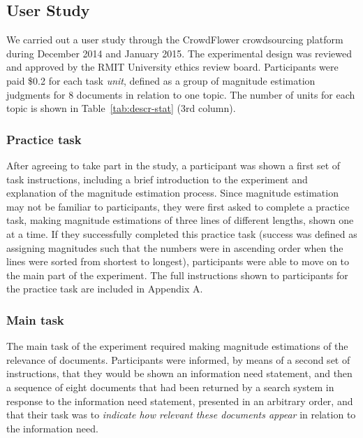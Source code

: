 \subsection{User Study}

We carried out a user study through the CrowdFlower crowdsourcing
platform during December 2014 and January 2015.
The experimental
design was reviewed and approved by the RMIT University 
ethics
review board.
Participants were paid \$0.2 for each task \emph{unit}, defined as a group of
magnitude estimation judgments for 8 documents in relation to one
topic. 
The number of units for each topic is shown in
Table~\ref{tab:descr-stat} (3rd column). 

\subsubsection{Practice task}
\label{sec:practice-task}

After agreeing to take part in the study, a participant was shown 
a first set of 
task
instructions, including a brief
introduction to the experiment and explanation of the
magnitude estimation process.
Since magnitude estimation may not be familiar to participants, they
were first asked to complete a practice task, making magnitude
estimations of three lines of different lengths, shown one at a time.
If they successfully completed this practice task (success was defined
as assigning magnitudes such that the numbers were in ascending order
when the lines were sorted from shortest to longest), participants were
able to move on to the main part of the experiment.
The full instructions shown to participants for the practice task are
included in Appendix A.

\subsubsection{Main task}
\label{sec:main-task}


The main task of the experiment required
making magnitude estimations of the relevance of documents.
Participants were informed, by means of a second set of instructions,
that they would be shown an information need statement, and then a
sequence of eight documents that had been returned by a search system
in response to the information need statement, presented in an
arbitrary order, and that their task was to 
\emph{indicate how relevant these documents appear} in relation to the information need. 

